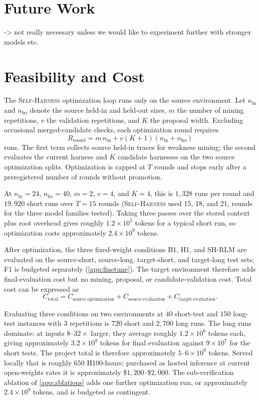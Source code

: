 \documentclass{article}
\newcommand{\sh}{\textsc{Self-Harness}\xspace}
\begin{document}
\section{Future Work}
-> not really necessary unless we would like to experiment further with stronger models etc.

\section{Feasibility and Cost}
\label{sec:cost}

The \sh{} optimization loop runs only on the source environment. Let $n_{\mathrm{in}}$ and $n_{\mathrm{ho}}$ denote the source held-in and held-out sizes, $m$ the number of mining repetitions, $v$ the validation repetitions, and $K$ the proposal width. Excluding occasional merged-candidate checks, each optimization round requires
\begin{equation*}
R_{\mathrm{round}}
=
m\,n_{\mathrm{in}}
+
v(K+1)(n_{\mathrm{in}}+n_{\mathrm{ho}})
\end{equation*}
runs. The first term collects source held-in traces for weakness mining; the second evaluates the current harness and $K$ candidate harnesses on the two source optimization splits. Optimization is capped at $T$ rounds and stops early after a preregistered number of rounds without promotion.

At $n_{\mathrm{in}}=24$, $n_{\mathrm{ho}}=40$, $m=2$, $v=4$, and $K=4$, this is $1{,}328$ runs per round and $19{,}920$ short runs over $T=15$ rounds (\sh{} used 15, 18, and 21, rounds for the three model families tested). Taking three passes over the stored context plus root overhead gives roughly $1.2\times10^{5}$ tokens for a typical short run, so optimization costs approximately $2.4\times10^{9}$ tokens.

After optimization, the three fixed-weight conditions B1, H1, and SH-RLM are evaluated on the source-short, source-long, target-short, and target-long test sets; F1 is budgeted separately (\cref{app:finetune}). The target environment therefore adds final-evaluation cost but no mining, proposal, or candidate-validation cost. Total cost can be expressed as
\begin{equation*}
C_{\mathrm{total}}
=
C_{\mathrm{source\ optimization}}
+
C_{\mathrm{source\ evaluation}}
+
C_{\mathrm{target\ evaluation}}.
\end{equation*}

Evaluating three conditions on two environments at $40$ short-test and $150$ long-test instances with $3$ repetitions is $720$ short and $2{,}700$ long runs. The long runs dominate: at inputs $8$--$32\times$ larger, they average roughly $1.2\times10^{6}$ tokens each, giving approximately $3.2\times10^{9}$ tokens for final evaluation against $9\times10^{7}$ for the short tests. The project total is therefore approximately $5$--$6\times10^{9}$ tokens. Served locally that is roughly $650$ H100-hours; purchased as hosted inference at current open-weights rates it is approximately \$$1{,}200$--\$$2{,}000$. The sub-verification ablation of \cref{app:ablations} adds one further optimization run, or approximately $2.4\times10^{9}$ tokens, and is budgeted as contingent.
\end{document}
